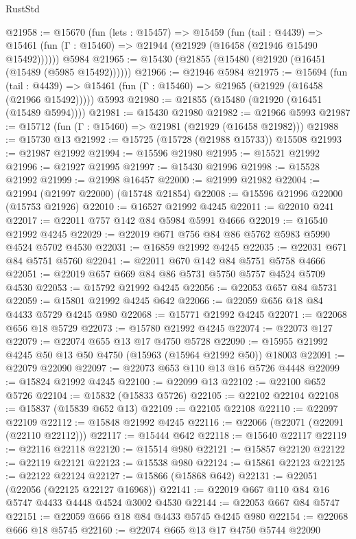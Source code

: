 \begin{lexlean}{RustStd}
\begin{coremodule}
{\begin{coremodule}
{{{{{{{{{{{{{{{{{{{{{{{{{{{{{{{{{{{{{{{{{{{{{{{{{{{{{{{{{{{{@21958 := @15670
    (fun (lets : @15457) =>
    @15459
      (fun (tail : @4439) =>
      @15461 (fun (Γ : @15460) => @21944 (@21929 (@16458 (@21946 @15490 @15492))))))
    @5984
@21965 := @15430 (@21855 (@15480 (@21920 (@16451 (@15489 (@5985 @15492))))))
@21966 := @21946 @5984
@21975 := @15694
    (fun (tail : @4439) => @15461 (fun (Γ : @15460) => @21965 (@21929 (@16458 (@21966 @15492)))))
    @5993
@21980 := @21855 (@15480 (@21920 (@16451 (@15489 @5994))))
@21981 := @15430 @21980
@21982 := @21966 @5993
@21987 := @15712 (fun (Γ : @15460) => @21981 (@21929 (@16458 @21982)))
@21988 := @15730 @13
@21992 := @15725 (@15728 (@21988 @15733)) @15508
@21993 := @21987 @21992
@21994 := @15596 @21980
@21995 := @15521 @21992
@21996 := @21927 @21995
@21997 := @15430 @21996
@21998 := @15528 @21992
@21999 := @21998 @16457
@22000 := @21999 @21982
@22004 := @21994 (@21997 @22000) (@15748 @21854)
@22008 := @15596 @21996 @22000 (@15753 @21926)
@22010 := @16527 @21992 @4245
@22011 := @22010 @241
@22017 := @22011 @757 @142 @84 @5984 @5991 @4666
@22019 := @16540 @21992 @4245
@22029 := @22019 @671 @756 @84 @86 @5762 @5983 @5990 @4524 @5702 @4530
@22031 := @16859 @21992 @4245
@22035 := @22031 @671 @84 @5751 @5760
@22041 := @22011 @670 @142 @84 @5751 @5758 @4666
@22051 := @22019 @657 @669 @84 @86 @5731 @5750 @5757 @4524 @5709 @4530
@22053 := @15792 @21992 @4245
@22056 := @22053 @657 @84 @5731
@22059 := @15801 @21992 @4245 @642
@22066 := @22059 @656 @18 @84 @4433 @5729 @4245 @980
@22068 := @15771 @21992 @4245
@22071 := @22068 @656 @18 @5729
@22073 := @15780 @21992 @4245
@22074 := @22073 @127
@22079 := @22074 @655 @13 @17 @4750 @5728
@22090 := @15955 @21992 @4245 @50 @13 @50 @4750 (@15963 (@15964 @21992 @50)) @18003
@22091 := @22079 @22090
@22097 := @22073 @653 @110 @13 @16 @5726 @4448
@22099 := @15824 @21992 @4245
@22100 := @22099 @13
@22102 := @22100 @652 @5726
@22104 := @15832 (@15833 @5726)
@22105 := @22102 @22104
@22108 := @15837 (@15839 @652 @13)
@22109 := @22105 @22108
@22110 := @22097 @22109
@22112 := @15848 @21992 @4245
@22116 := @22066 (@22071 (@22091 (@22110 @22112)))
@22117 := @15444 @642
@22118 := @15640 @22117
@22119 := @22116 @22118
@22120 := @15514 @980
@22121 := @15857 @22120
@22122 := @22119 @22121
@22123 := @15538 @980
@22124 := @15861 @22123
@22125 := @22122 @22124
@22127 := @15866 (@15868 @642)
@22131 := @22051 (@22056 (@22125 @22127 @16968))
@22141 := @22019 @667 @110 @84 @16 @5747 @4433 @4448 @4524 @3002 @4530
@22144 := @22053 @667 @84 @5747
@22151 := @22059 @666 @18 @84 @4433 @5745 @4245 @980
@22154 := @22068 @666 @18 @5745
@22160 := @22074 @665 @13 @17 @4750 @5744 @22090
}}}}}}}}}}}}}}}}}}}}}}}}}}}}}}}}}}}}}}}}}}}}}}}}}}}}}}}}}}}}
\end{coremodule}}
\end{coremodule}
\end{lexlean}
